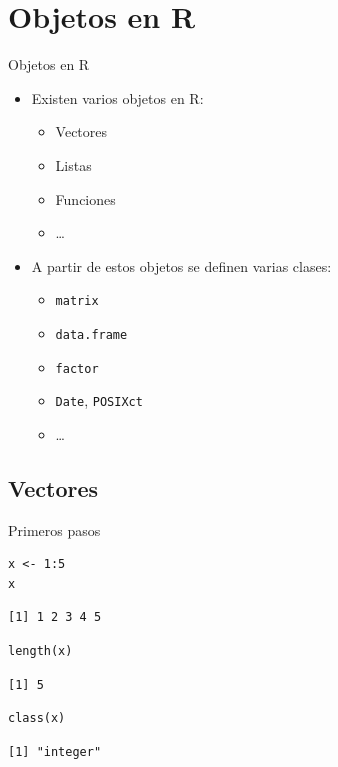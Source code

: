 \documentclass[xcolor={usenames,svgnames,dvipsnames}]{beamer}
\begin{document}
\section{Objetos en R}
\label{sec-2}

\begin{frame}[fragile,label=sec-2-0-1]{Objetos en R}
 \begin{itemize}
\item Existen varios objetos en R:
\begin{itemize}
\item Vectores
\item Listas
\item Funciones
\item \ldots{}
\end{itemize}
\item A partir de estos objetos se definen varias clases:
\begin{itemize}
\item \texttt{matrix}
\item \texttt{data.frame}
\item \texttt{factor}
\item \texttt{Date}, \texttt{POSIXct}
\item \ldots{}
\end{itemize}
\end{itemize}
\end{frame}

\subsection{Vectores}
\label{sec-2-1}

\begin{frame}[fragile,label=sec-2-1-1]{Primeros pasos}
 \lstset{language=R,label= ,caption= ,numbers=none}
\begin{lstlisting}
x <- 1:5
x
\end{lstlisting}

\begin{verbatim}
[1] 1 2 3 4 5
\end{verbatim}

\lstset{language=R,label= ,caption= ,numbers=none}
\begin{lstlisting}
length(x)
\end{lstlisting}

\begin{verbatim}
[1] 5
\end{verbatim}

\lstset{language=R,label= ,caption= ,numbers=none}
\begin{lstlisting}
class(x)
\end{lstlisting}

\begin{verbatim}
[1] "integer"
\end{verbatim}
\end{frame}
\end{document}
